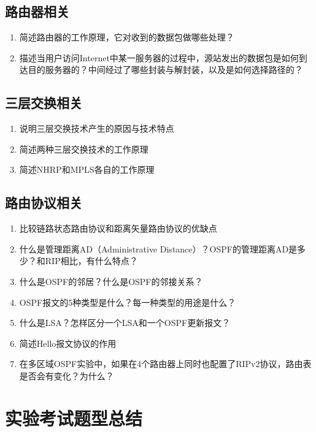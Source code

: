 \documentclass[12pt,a4paper]{ctexart}
\begin{document}
\subsection{路由器相关}

\begin{enumerate}[leftmargin=2em,itemsep=0pt]
    \item 简述路由器的工作原理，它对收到的数据包做哪些处理？
    \item 描述当用户访问Internet中某一服务器的过程中，源站发出的数据包是如何到达目的服务器的？中间经过了哪些封装与解封装，以及是如何选择路径的？
\end{enumerate}

\subsection{三层交换相关}

\begin{enumerate}[leftmargin=2em,itemsep=0pt]
    \item 说明三层交换技术产生的原因与技术特点
    \item 简述两种三层交换技术的工作原理
    \item 简述NHRP和MPLS各自的工作原理
\end{enumerate}

\subsection{路由协议相关}

\begin{enumerate}[leftmargin=2em,itemsep=0pt]
    \item 比较链路状态路由协议和距离矢量路由协议的优缺点
    \item 什么是管理距离AD（Administrative Distance）？OSPF的管理距离AD是多少？和RIP相比，有什么特点？
    \item 什么是OSPF的邻居？什么是OSPF的邻接关系？
    \item OSPF报文的5种类型是什么？每一种类型的用途是什么？
    \item 什么是LSA？怎样区分一个LSA和一个OSPF更新报文？
    \item 简述Hello报文协议的作用
    \item 在多区域OSPF实验中，如果在4个路由器上同时也配置了RIPv2协议，路由表是否会有变化？为什么？
\end{enumerate}

\section{实验考试题型总结}
\end{document}
